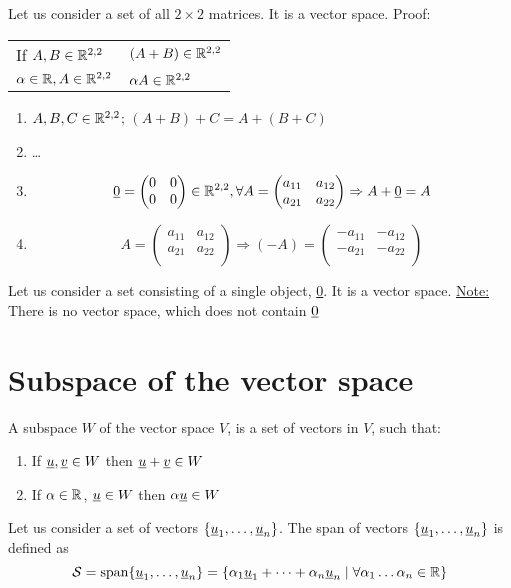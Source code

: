 \begin{example}
Let us consider a set of all $2\times 2$ matrices. It is a vector space. Proof:
\begin{tabular}{l l}
If $A,B\in\mathbb{R}^{2,2}$ & $(A+B)\in\mathbb{R}^{2,2}$\\
$\alpha\in\mathbb{R}, A\in\mathbb{R}^{2,2}$ & $\alpha A \in \mathbb{R}^{2,2}$
\end{tabular}
\begin{enumerate}
\item $A,B,C\in\mathbb{R}^{2,2}$; $(A+B)+C = A+(B+C)$
\item \dots 
\item \[
\underline{0} = \begin{pmatrix}
0 & 0\\
0 & 0
\end{pmatrix}\in \mathbb{R}^{2,2}, \forall A = \begin{pmatrix}
a_{11} & a_{12}\\
a_{21} & a_{22}\\
\end{pmatrix} \Rightarrow A+\underline{0} = A
\]
\item \[
A = \begin{pmatrix}
a_{11} & a_{12}\\
a_{21} & a_{22}\\
\end{pmatrix}\Rightarrow (-A) = \begin{pmatrix}
-a_{11} & -a_{12}\\
-a_{21} & -a_{22}\\
\end{pmatrix}
\]
\end{enumerate}
\end{example}
\begin{example}
Let us consider a set consisting of a single object, \ul{0}. It is a vector space. \underline{Note:} There is no vector space, which does not contain $\underline{0}$
\end{example}

\section{Subspace of the vector space}
\begin{definition}
A subspace $W$ of the vector space $V$, is a set of vectors in $V$, such that:
\begin{enumerate}
	\item If $\underline{u},\underline{v}\in W$ then $\underline{u}+\underline{v}\in W$
\item If $\alpha \in\mathbb{R}$, $\underline{u}\in W$ then $\alpha \underline{u}\in W$
\end{enumerate}
\end{definition}
\begin{definition}
Let us consider a set of vectors $\{ \underline{u}_1,\dots,\underline{u}_n \}$. The span of vectors $\{ \underline{u}_1,\dots,\underline{u}_n \}$ is defined as
\[ \mathcal{S} = \text{span}\{\underline{u}_1,\dots,\underline{u}_n\} = \{\alpha_1\underline{u}_1+\dots+\alpha_n\underline{u}_n\mid \forall\alpha_1\dots\alpha_n\in\mathbb{R}\}\]
\end{definition}

